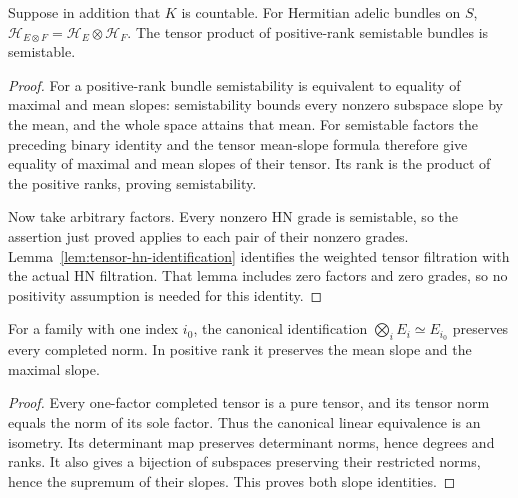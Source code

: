 \begin{theorem}
\label{thm:tensor-hn-compatibility}
\leanok
Suppose in addition that $K$ is countable. For Hermitian adelic bundles on $S$,
$\mathcal H_{E\otimes F}=\mathcal H_E\otimes\mathcal H_F$.
The tensor product of positive-rank semistable bundles is semistable.
\end{theorem}
\begin{proof}
For a positive-rank bundle semistability is equivalent to equality
of maximal and mean slopes: semistability bounds every nonzero subspace
slope by the mean, and the whole space attains that mean. For semistable
factors the preceding binary identity and the tensor mean-slope formula
therefore give equality of maximal and mean slopes of their tensor.
Its rank is the product of the positive ranks, proving semistability.

Now take arbitrary factors. Every nonzero HN grade is semistable, so
the assertion just proved applies to each pair of their nonzero grades.
Lemma~\ref{lem:tensor-hn-identification} identifies the weighted tensor
filtration with the actual HN filtration. That lemma includes zero
factors and zero grades, so no positivity assumption is needed for this
identity.
\end{proof}

\begin{lemma}
\label{lem:finite-tensor-singleton-isometry}
\leanok
For a family with one index $i_0$, the canonical identification
$\bigotimes_i E_i\simeq E_{i_0}$ preserves every completed norm.
In positive rank it preserves the mean slope and the maximal slope.
\end{lemma}
\begin{proof}
Every one-factor completed tensor is a pure tensor, and its tensor norm
equals the norm of its sole factor. Thus the canonical linear equivalence
is an isometry. Its determinant map preserves determinant norms, hence
degrees and ranks. It also gives a bijection of subspaces preserving
their restricted norms, hence the supremum of their slopes. This proves
both slope identities.
\end{proof}

